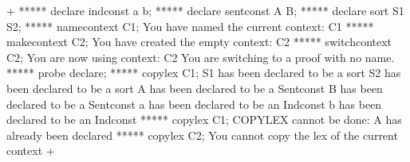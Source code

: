 




\gfexample+
   ***** declare indconst a b;
   ***** declare sentconst A B;
   ***** declare sort S1 S2;
   ***** namecontext C1;
   You have named the current context: C1
   ***** makecontext C2;
   You have created the empty context: C2
   ***** switchcontext C2;
   You are now using context: C2
   You are switching to a proof with no name.
   ***** probe declare;
   ***** copylex C1;
   S1 has been declared to be a sort
   S2 has been declared to be a sort
   A has been declared to be a Sentconst
   B has been declared to be a Sentconst
   a has been declared to be an Indconst
   b has been declared to be an Indconst
   ***** copylex C1;
   COPYLEX cannot be done: A has already been declared
   ***** copylex C2;
   You cannot copy the lex of the current context
+
